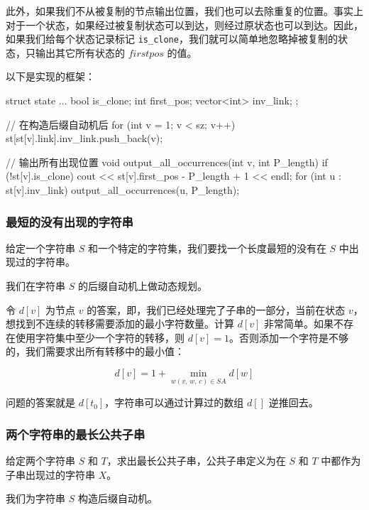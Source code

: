 此外，如果我们不从被复制的节点输出位置，我们也可以去除重复的位置。事实上对于一个状态，如果经过被复制状态可以到达，则经过原状态也可以到达。因此，如果我们给每个状态记录标记 \texttt{is_clone}，我们就可以简单地忽略掉被复制的状态，只输出其它所有状态的 $firstpos$ 的值。

以下是实现的框架：

\begin{cppcode}
struct state {
  ... bool is_clone;
  int first_pos;
  vector<int> inv_link;
};

// 在构造后缀自动机后
for (int v = 1; v < sz; v++) {
  st[st[v].link].inv_link.push_back(v);
}

// 输出所有出现位置
void output_all_occurrences(int v, int P_length) {
  if (!st[v].is_clone) cout << st[v].first_pos - P_length + 1 << endl;
  for (int u : st[v].inv_link) output_all_occurrences(u, P_length);
}
\end{cppcode}

\subsubsection{最短的没有出现的字符串}

\begin{QUOTE}{}{}
给定一个字符串 $S$ 和一个特定的字符集，我们要找一个长度最短的没有在 $S$ 中出现过的字符串。
\end{QUOTE}

我们在字符串 $S$ 的后缀自动机上做动态规划。

令 $d[v]$ 为节点 $v$ 的答案，即，我们已经处理完了子串的一部分，当前在状态 $v$，想找到不连续的转移需要添加的最小字符数量。计算 $d[v]$ 非常简单。如果不存在使用字符集中至少一个字符的转移，则 $d[v]=1$。否则添加一个字符是不够的，我们需要求出所有转移中的最小值：

$$
d[v]=1+\min_{w(v,\,w,\,c)\in SA}d[w]
$$

问题的答案就是 $d[t_0]$，字符串可以通过计算过的数组 $d[]$ 逆推回去。

\subsubsection{两个字符串的最长公共子串}

\begin{QUOTE}{}{}
给定两个字符串 $S$ 和 $T$，求出最长公共子串，公共子串定义为在 $S$ 和 $T$ 中都作为子串出现过的字符串 $X$。
\end{QUOTE}

我们为字符串 $S$ 构造后缀自动机。

